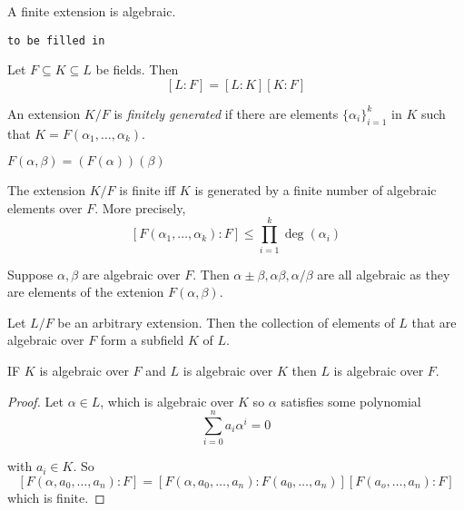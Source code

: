 \documentclass[a4paper]{article}
\begin{document}
\begin{cor}
  A finite extension is algebraic.
\end{cor}

\begin{eg}

  \texttt{to be filled in}
\end{eg}

\begin{thm}
  Let $F\subseteq K\subseteq L$ be fields. Then
  \[
    [L:F] = [L:K][K:F]
  \]
\end{thm}

\begin{defi}
  An extension $K/F$ is \emph{finitely generated} if there are elements $\{\alpha_i\}_{i=1}^k$ in $K$ such that $K=F(\alpha_1,\ldots,\alpha_k)$.
\end{defi}

\begin{lem}
  $F(\alpha,\beta) = (F(\alpha))(\beta)$
\end{lem}

\begin{thm}
  The extension $K/F$ is finite iff $K$ is generated by a finite number of algebraic elements over $F$. More precisely,
  \[
    [F(\alpha_1,\ldots,\alpha_k):F] \leq \prod_{i=1}^{k} \deg(\alpha_i)
  \]
\end{thm}

\begin{cor}
  Suppose $\alpha,\beta$ are algebraic over $F$. Then $\alpha\pm\beta,\alpha\beta,\alpha/\beta$ are all algebraic as they are elements of the extenion $F(\alpha,\beta)$.
\end{cor}

\begin{cor}
  Let $L/F$ be an arbitrary extension. Then the collection of elements of $L$ that are algebraic over $F$ form a subfield $K$ of $L$.
\end{cor}

\begin{thm}
  IF $K$ is algebraic over $F$ and $L$ is algebraic over $K$ then $L$ is algebraic over $F$.
\end{thm}

\begin{proof}
  Let $\alpha\in L$, which is algebraic over $K$ so $\alpha$ satisfies some polynomial
  \[
    \sum_{i=0}^{n} a_i \alpha^i = 0
  \]

  with $a_i\in K$. So
  \[
    [F(\alpha,a_0,\ldots,a_n):F] = [F(\alpha,a_0,\ldots,a_n):F(a_0,\ldots,a_n)][F(a_o,\ldots,a_n):F]
  \]
  which is finite.
\end{proof}
\end{document}
